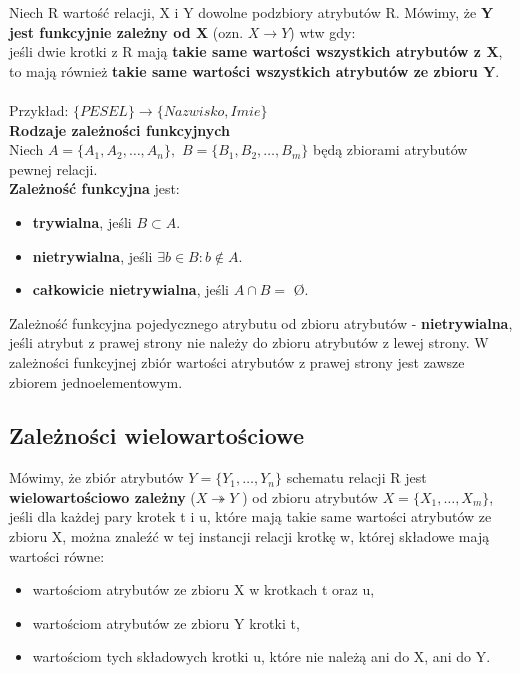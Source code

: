 \documentclass[a4paper]{article}
\begin{document}
Niech R wartość relacji, X i Y dowolne podzbiory atrybutów R. Mówimy, że \textbf{Y jest funkcyjnie zależny od X} (ozn. $X \rightarrow Y$) wtw gdy: \\
jeśli dwie krotki z R mają \textbf{takie same wartości wszystkich atrybutów z X}, to mają również \textbf{takie same wartości wszystkich atrybutów ze zbioru Y}.\\\\
Przykład:
$\{PESEL\} \longrightarrow \{Nazwisko, Imie\}$\\

\textbf{Rodzaje zależności funkcyjnych}\\
Niech $A = \{A_1, A_2,\dots, A_n\},$ $B = \{B_1, B_2, \dots, B_m\}$ będą zbiorami atrybutów pewnej relacji.\\
\textbf{Zależność funkcyjna} jest:
\begin{itemize}
    \item \textbf{trywialna}, jeśli $B \subset A$.
    \item \textbf{nietrywialna}, jeśli $\exists b \in B : b \notin A$.
    \item \textbf{całkowicie nietrywialna}, jeśli $A \cap B =$  \O.
\end{itemize}

Zależność funkcyjna pojedycznego atrybutu od zbioru atrybutów - \textbf{nietrywialna}, jeśli atrybut z prawej strony nie należy do zbioru atrybutów z lewej strony. W zależności funkcyjnej zbiór wartości atrybutów z prawej strony jest zawsze zbiorem jednoelementowym.\\

\subsection{Zależności wielowartościowe}
Mówimy, że zbiór atrybutów $Y=\{Y_1, \dots ,Y_n\}$ schematu relacji R jest \textbf{wielowartościowo zależny} ($ X \twoheadrightarrow Y$ ) od zbioru atrybutów $X=\{X_1,\dots,X_m\}$, jeśli dla każdej pary krotek t i u, które mają takie same wartości atrybutów ze zbioru X, można znaleźć w tej instancji relacji krotkę w, której składowe mają wartości równe:
\begin{itemize}
    \item wartościom atrybutów ze zbioru X w krotkach t oraz u,
    \item wartościom atrybutów ze zbioru Y krotki t,
    \item wartościom tych składowych krotki u, które nie należą ani do X, ani do Y.
\end{itemize}
\end{document}

